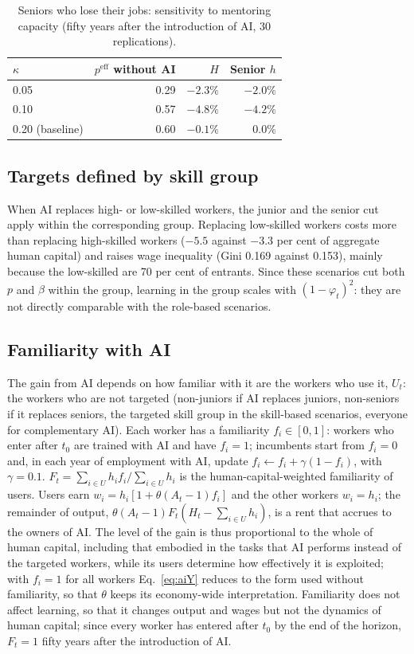 \documentclass[preprint,12pt,authoryear]{elsarticle}
\begin{document}
\begin{table}[h]\centering\small
\caption{Seniors who lose their jobs: sensitivity to mentoring capacity (fifty years after the introduction of AI, 30 replications).}\label{tab:kappa}
\begin{tabular}{@{}lrrr@{}}
\toprule
$\kappa$ & $p^{\mathrm{eff}}$ without AI & $H$ & Senior $h$ \\
\midrule
0.05 & 0.29 & $-2.3\%$ & $-2.0\%$ \\
0.10 & 0.57 & $-4.8\%$ & $-4.2\%$ \\
0.20 (baseline) & 0.60 & $-0.1\%$ & $0.0\%$ \\
\bottomrule
\end{tabular}
\end{table}

\subsection{Targets defined by skill group}

When AI replaces high- or low-skilled workers, the junior and the senior cut apply within the corresponding group. Replacing low-skilled workers costs more than replacing high-skilled workers ($-5.5$ against $-3.3$ per cent of aggregate human capital) and raises wage inequality (Gini 0.169 against 0.153), mainly because the low-skilled are 70 per cent of entrants. Since these scenarios cut both $p$ and $\beta$ within the group, learning in the group scales with $(1-\varphi_t)^2$: they are not directly comparable with the role-based scenarios.

\subsection{Familiarity with AI}

The gain from AI depends on how familiar with it are the workers who use it, $U_t$: the workers who are not targeted (non-juniors if AI replaces juniors, non-seniors if it replaces seniors, the targeted skill group in the skill-based scenarios, everyone for complementary AI). Each worker has a familiarity $f_i\in[0,1]$: workers who enter after $t_0$ are trained with AI and have $f_i=1$; incumbents start from $f_i=0$ and, in each year of employment with AI, update $f_i \leftarrow f_i+\gamma(1-f_i)$, with $\gamma=0.1$. $F_t=\sum_{i\in U}h_if_i/\sum_{i\in U}h_i$ is the human-capital-weighted familiarity of users. Users earn $w_i=h_i[1+\theta(A_t-1)f_i]$ and the other workers $w_i=h_i$; the remainder of output, $\theta(A_t-1)F_t(H_t-\sum_{i\in U}h_i)$, is a rent that accrues to the owners of AI. The level of the gain is thus proportional to the whole of human capital, including that embodied in the tasks that AI performs instead of the targeted workers, while its users determine how effectively it is exploited; with $f_i=1$ for all workers Eq.~\eqref{eq:aiY} reduces to the form used without familiarity, so that $\theta$ keeps its economy-wide interpretation. Familiarity does not affect learning, so that it changes output and wages but not the dynamics of human capital; since every worker has entered after $t_0$ by the end of the horizon, $F_t=1$ fifty years after the introduction of AI.
\end{document}
